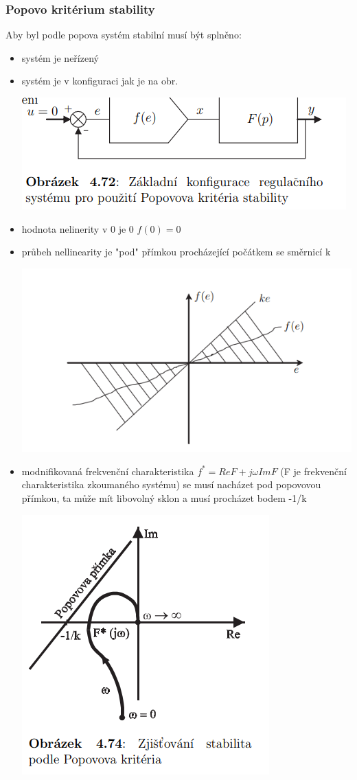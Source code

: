 \subsubsection{Popovo kritérium stability}
Aby byl podle popova systém stabilní musí být splněno:
\begin{itemize}
    \item systém je neřízený
    \item systém  je v konfiguraci jak je na obr.

          \includegraphics{img/popov.schem.png}
    \item hodnota nelinerity v 0 je 0 $f(0)=0$
    \item průbeh nellinearity je "pod" přímkou procházející počátkem se směrnicí k

          \includegraphics{img/popov_nelilin.png}
    \item modnifikovaná frekvenční charakteristika $f^*=Re{F}+j\omega Im{F}$ (F je frekvenční charakteristika zkoumaného systému) se musí nacházet pod popovovou přímkou,
          ta může mít libovolný sklon a musí procházet bodem -1/k

          \includegraphics{img/popov_frek.png}
\end{itemize}
